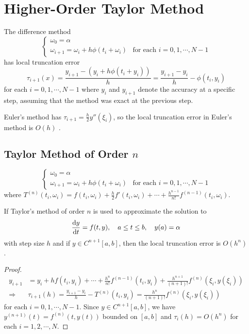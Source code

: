 \section{Higher-Order Taylor Method}
\begin{defn}
The difference method
\begin{equation*}
  \begin{cases}
    \omega_0=\alpha & \\
    \omega_{i+1}=\omega_i+h\phi(t_i+\omega_i) & \text{for each $i=0,1,\cdots,N-1$}
  \end{cases}
\end{equation*}
has local truncation error
\begin{equation*}
  \tau_{i+1}(x)=\frac{y_{i+1}-\left(y_i+h\phi(t_i+y_i)\right)}{h}=\frac{y_{i+1}-y_i}{h}-\phi(t_i,y_i)
\end{equation*}
for each $i=0,1,\cdots,N-1$ where $y_i$ and $y_{i+1}$ denote the accuracy at a specific step, assuming that the method was exact at the previous step.
\end{defn}
Euler's method has $\tau_{i+1}=\frac{h}{2}y''(\xi_i)$, so the local truncation error in Euler's method is $O(h)$ .
\subsection{Taylor Method of Order $n$}
\begin{equation*}
  \begin{cases}
    \omega_0=\alpha & \\
    \omega_{i+1}=\omega_i+h\phi(t_i+\omega_i) & \text{for each $i=0,1,\cdots,N-1$}
  \end{cases}
\end{equation*}
where $T^{(n)}(t_i,\omega_i)=f(t_i,\omega_i)+\frac{h}{2}f'(t_i,\omega_i)+\cdots+\frac{h^{n-1}}{n!}f^{(n-1)}(t_i,\omega_i)$.
\begin{theo}
If Taylor's method of order $n$ is used to approximate the solution to
\[
\frac{\mathrm{d} y}{\mathrm{d} t}=f(t,y),\quad a\leq t\leq b,\quad y(a)=\alpha
\]
with step size $h$ and if $y\in C^{n+1}[a,b]$, then the local truncation error is $O(h^n)$.
\end{theo}
\begin{proof}
\begin{align*}
  y_{i+1} &= y_i+hf(t_i,y_i)+\cdots+\frac{h^n}{n!}f^{(n-1)}(t_i,y_i)+\frac{h^{n+1}}{(n+1)!}f^{(n)}(\xi_i,y(\xi_i)) \\
  \Rightarrow & \tau_{i+1}(h) = \frac{y_{i+1}-y_i}{h}-T^{(n)}(t_i,y_i)=\frac{h^n}{(n+1)!}f^{(n)}(\xi_i,y(\xi_i))
\end{align*}
for each $i=0,1,\cdots,N-1$. Since $y\in C^{n+1}[a,b]$, we have $y^{(n+1)}(t)=f^{(n)}(t,y(t))$ bounded on $[a,b]$ and $\tau_i(h)=O(h^n)$ for each $i=1,2,\cdots,N$.
\end{proof}